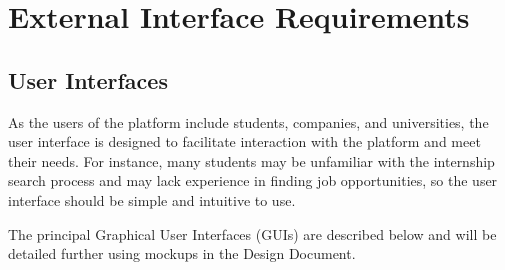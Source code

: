\renewcommand{\thesection}{\Alph{section}}
\section{External Interface Requirements}
\subsection{User Interfaces}
As the users of the platform include students, companies, and universities, the user interface is designed to facilitate interaction with 
the platform and meet their needs. For instance, many students may be unfamiliar with the internship search process and may lack experience
in finding job opportunities, so the user interface should be simple and intuitive to use.

The principal Graphical User Interfaces (GUIs) are described below and will be detailed further using mockups in the Design Document.
